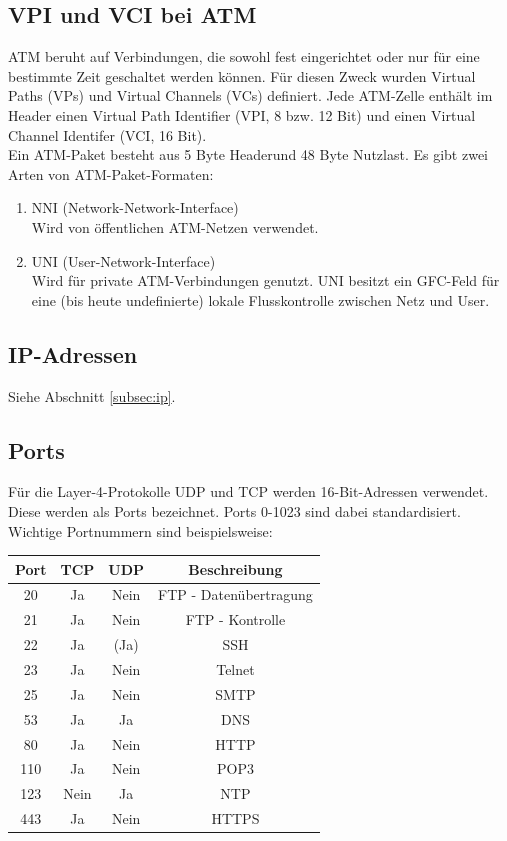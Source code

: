 \documentclass{article} %
\begin{document}
\subsection{VPI und VCI bei ATM}
ATM beruht auf Verbindungen, die sowohl fest eingerichtet oder nur für eine bestimmte Zeit geschaltet werden können. Für diesen Zweck wurden Virtual Paths (VPs) und Virtual Channels (VCs) definiert. Jede ATM-Zelle enthält im Header einen Virtual Path Identifier (VPI, 8 bzw. 12 Bit) und einen Virtual Channel Identifer (VCI, 16 Bit).\\
Ein ATM-Paket besteht aus 5 Byte Headerund 48 Byte Nutzlast. Es gibt zwei Arten von ATM-Paket-Formaten:
	\begin{enumerate}
		\item NNI (Network-Network-Interface)\\
		Wird von öffentlichen ATM-Netzen verwendet.	
		\item UNI (User-Network-Interface)\\
		Wird für private ATM-Verbindungen genutzt. UNI besitzt ein GFC-Feld für eine (bis heute undefinierte) lokale Flusskontrolle zwischen Netz und User.
	\end{enumerate}
\subsection{IP-Adressen}

Siehe Abschnitt \ref{subsec:ip}.

\subsection{Ports}

Für die Layer-4-Protokolle UDP und TCP werden 16-Bit-Adressen verwendet.
Diese werden als Ports bezeichnet.
Ports 0-1023 sind dabei standardisiert.
Wichtige Portnummern sind beispielsweise:
\begin{center}
\begin{tabular}{|c|c|c|c|}
	\hline Port & TCP & UDP & Beschreibung \\ 
	\hline 20 & Ja & Nein & FTP - Datenübertragung \\ 
	\hline 21 & Ja & Nein & FTP - Kontrolle \\ 
	\hline 22 & Ja & (Ja) & SSH \\ 
	\hline 23 & Ja & Nein & Telnet \\ 
	\hline 25 & Ja & Nein & SMTP \\ 
	\hline 53 & Ja & Ja & DNS \\ 
	\hline 80 & Ja & Nein & HTTP \\ 
	\hline 110 & Ja & Nein & POP3 \\ 
	\hline 123 & Nein & Ja & NTP \\ 
	\hline 443 & Ja & Nein & HTTPS \\ 
	\hline 
\end{tabular} 
\end{center}
\end{document}
